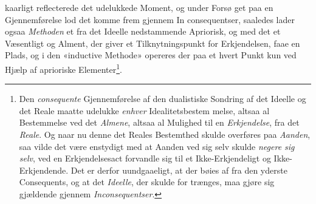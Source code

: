 kaarligt reflecterede det udelukkede Moment, og under Forsø\-%
get paa en Gjennemførelse lod det komme frem gjennem In\-%
consequentser, saaledes lader ogsaa \emph{Methoden} et fra det
Ideelle nedstammende Apriorisk, og med det et Væsentligt og
Alment, der giver et Tilknytningspunkt for Erkjendelsen, faae
en Plads, og i den «inductive Methode» opereres der paa et\-%
hvert Punkt kun ved Hjælp af aprioriske Elementer\footnote{Den \emph{consequente} Gjennemførelse af den dualistiske Sondring af
det Ideelle og det Reale maatte udelukke \emph{enhver} Idealitetsbestem\-%
melse, altsaa al Bestemmelse ved det \emph{Almene}, altsaa al Mulighed
til en \emph{Erkjendelse}, fra det \emph{Reale}. Og naar nu denne det
Reales Bestemthed skulde overføres paa \emph{Aanden}, saa vilde det
være enstydigt med at Aanden ved sig selv skulde \emph{negere sig
selv}, ved en Erkjendelsesact forvandle sig til et Ikke-Erkjendeligt
og Ikke-Erkjendende. Det er derfor uundgaaeligt, at der bøies af
fra den yderste Consequents, og at det \emph{Ideelle}, der skulde for\-%
trænges, maa gjøre sig gjældende gjennem \emph{Inconsequentser}.}.

